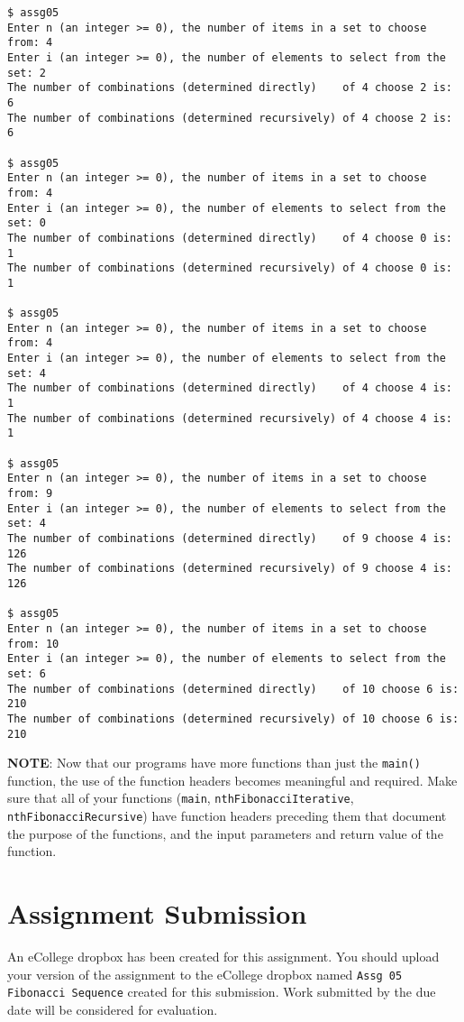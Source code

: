 \documentclass[11pt]{article}
\begin{document}
\begin{verbatim}
$ assg05 
Enter n (an integer >= 0), the number of items in a set to choose from: 4
Enter i (an integer >= 0), the number of elements to select from the set: 2
The number of combinations (determined directly)    of 4 choose 2 is: 6
The number of combinations (determined recursively) of 4 choose 2 is: 6

$ assg05 
Enter n (an integer >= 0), the number of items in a set to choose from: 4
Enter i (an integer >= 0), the number of elements to select from the set: 0
The number of combinations (determined directly)    of 4 choose 0 is: 1
The number of combinations (determined recursively) of 4 choose 0 is: 1

$ assg05 
Enter n (an integer >= 0), the number of items in a set to choose from: 4
Enter i (an integer >= 0), the number of elements to select from the set: 4
The number of combinations (determined directly)    of 4 choose 4 is: 1
The number of combinations (determined recursively) of 4 choose 4 is: 1

$ assg05 
Enter n (an integer >= 0), the number of items in a set to choose from: 9
Enter i (an integer >= 0), the number of elements to select from the set: 4
The number of combinations (determined directly)    of 9 choose 4 is: 126
The number of combinations (determined recursively) of 9 choose 4 is: 126

$ assg05 
Enter n (an integer >= 0), the number of items in a set to choose from: 10
Enter i (an integer >= 0), the number of elements to select from the set: 6
The number of combinations (determined directly)    of 10 choose 6 is: 210
The number of combinations (determined recursively) of 10 choose 6 is: 210
\end{verbatim}


\textbf{NOTE}: Now that our programs have more functions than just the
\verb~main()~ function, the use of the function headers becomes meaningful
and required.  Make sure that all of your functions (\verb~main~,
\verb~nthFibonacciIterative~, \verb~nthFibonacciRecursive~) have function
headers preceding them that document the purpose of the functions, and
the input parameters and return value of the function.
\section*{Assignment Submission}
\label{sec-4}


An eCollege dropbox has been created for this assignment.  You should
upload your version of the assignment to the eCollege dropbox named
\verb~Assg 05 Fibonacci Sequence~ created for this submission.  Work
submitted by the due date will be considered for evaluation.
\end{document}
